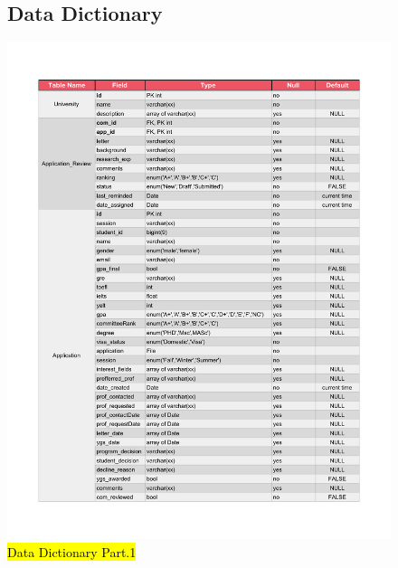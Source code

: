 \documentclass[fontsize=12pt,paper=letter,twoside]{scrartcl}
\begin{document}
\begin{figure}[!htb]
\subsection{Data Dictionary}

\begin{center}
\includegraphics[width=\textwidth, page=1]{images/data_dictionary.pdf}
\end{center}
\caption{\hl{Data Dictionary Part.1}}
\label{fig:dd1}
\end{figure}

\clearpage
\newpage
\end{document}

